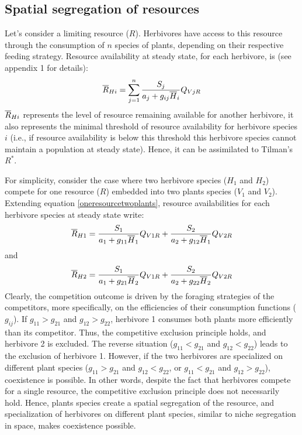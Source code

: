 \documentclass[12pt]{article}
\newcommand\barre[1]{\overline{\rule{0pt}{1.5ex}#1}}
\begin{document}
\subsection*{Spatial segregation of resources}
Let's consider a limiting resource ($R$). %
Herbivores have access to this resource through the consumption of $n$ species of plants, depending on their respective feeding strategy.   
Resource availability at steady state, for each herbivore, is (see appendix 1 for details):
\begin{equation}\label{oneresourcetwoplants}
\barre{R}_{Hi}=\sum ^n _{j=1} \frac{S_j}{a_j+g_{ij}\barre{H}_i}Q_{VjR}
\end{equation}
$\barre{R}_{Hi}$ represents the level of resource remaining available for another herbivore, it also represents the minimal threshold of resource availability for herbivore species $i$ (i.e., if resource availability is below this threshold this herbivore species cannot maintain a population at steady state). Hence, it can be assimilated to Tilman's $R^*$. \par
For simplicity, consider the case where two herbivore species ($H_1$ and $H_2$) compete for one resource ($R$) embedded into two plants species ($V_1$ and $V_2$). Extending equation \ref{oneresourcetwoplants}, resource availabilities for each herbivore species at steady state write:
\begin{equation}
\barre{R}_{H1}=\frac{S_1}{a_1+g_{11}\barre{H}_1}Q_{V1R}+\frac{S_2}{a_2+g_{12}\barre{H}_1}Q_{V2R}
\end{equation}
and
\begin{equation}
\barre{R}_{H2}=\frac{S_1}{a_1+g_{21}\barre{H}_2}Q_{V1R}+\frac{S_2}{a_2+g_{22}\barre{H}_2}Q_{V2R}
\end{equation}
Clearly, the competition outcome is driven by the foraging strategies of the competitors, more specifically, on the efficiencies of their consumption functions ($g_{ij}$). If $g_{11}>g_{21}$ and $g_{12}>g_{22}$, herbivore 1 consumes both plants more efficiently than its competitor. Thus, the competitive exclusion principle holds, and herbivore 2 is excluded. The reverse situation ($g_{11}<g_{21}$ and $g_{12}<g_{22}$) leads to the exclusion of herbivore 1. However, if the two herbivores are specialized on different plant species ($g_{11}>g_{21}$ and $g_{12}<g_{22}$, or  $g_{11}<g_{21}$ and $g_{12}>g_{22}$), coexistence is possible. In other words, despite the fact that herbivores compete for a single resource, the competitive exclusion principle does not necessarily hold. Hence, plants species create a spatial segregation of the resource, and specialization of herbivores on different plant species, similar to niche segregation in space, makes coexistence possible.%
\end{document}
